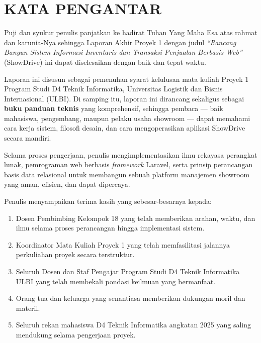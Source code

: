 \documentclass[11pt, a5paper]{article}
\begin{document}
\setcounter{page}{2}

\newpage
\section*{KATA PENGANTAR}

Puji dan syukur penulis panjatkan ke hadirat Tuhan Yang Maha Esa atas rahmat
dan karunia-Nya sehingga Laporan Akhir Proyek 1 dengan judul \textit{``Rancang
Bangun Sistem Informasi Inventaris dan Transaksi Penjualan Berbasis Web''}
(ShowDrive) ini dapat diselesaikan dengan baik dan tepat waktu.

Laporan ini disusun sebagai pemenuhan syarat kelulusan mata kuliah Proyek 1
Program Studi D4 Teknik Informatika, Universitas Logistik dan Bisnis
Internasional (ULBI). Di samping itu, laporan ini dirancang sekaligus sebagai
\textbf{buku panduan teknis} yang komprehensif, sehingga pembaca — baik
mahasiswa, pengembang, maupun pelaku usaha showroom — dapat memahami cara kerja
sistem, filosofi desain, dan cara mengoperasikan aplikasi ShowDrive secara
mandiri.

Selama proses pengerjaan, penulis mengimplementasikan ilmu rekayasa perangkat
lunak, pemrograman web berbasis \textit{framework} Laravel, serta prinsip
perancangan basis data relasional untuk membangun sebuah platform manajemen
showroom yang aman, efisien, dan dapat dipercaya.

Penulis menyampaikan terima kasih yang sebesar-besarnya kepada:
\begin{enumerate}
  \item Dosen Pembimbing Kelompok 18 yang telah memberikan arahan, waktu, dan
        ilmu selama proses perancangan hingga implementasi sistem.
  \item Koordinator Mata Kuliah Proyek 1 yang telah memfasilitasi jalannya
        perkuliahan proyek secara terstruktur.
  \item Seluruh Dosen dan Staf Pengajar Program Studi D4 Teknik Informatika ULBI
        yang telah membekali pondasi keilmuan yang bermanfaat.
  \item Orang tua dan keluarga yang senantiasa memberikan dukungan moril dan
        materil.
  \item Seluruh rekan mahasiswa D4 Teknik Informatika angkatan 2025 yang saling
        mendukung selama pengerjaan proyek.
\end{enumerate}
\end{document}
